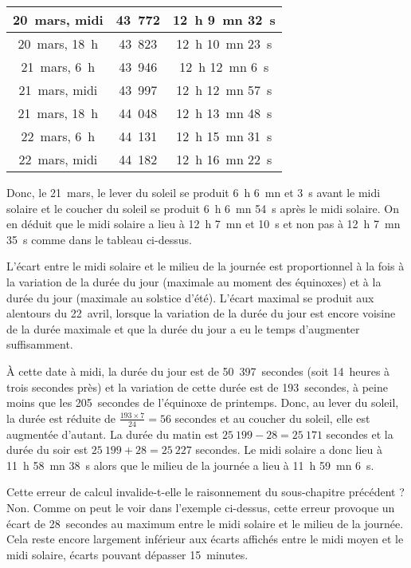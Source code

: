 \documentclass[a4paper]{article}
\newenvironment{texte}{\rmfamily}{}
\begin{document}
\begin{texte}
\vspace{2mm}
\begin{tabular}{|c|c|c|}
\hline
20~mars, midi & 43~772 & 12~h 9~mn 32~s \\
\hline
20~mars, 18~h & 43~823 & 12~h 10~mn 23~s \\
\hline
21~mars, 6~h & 43~946 & 12~h 12~mn 6~s \\
\hline
21~mars, midi & 43~997 & 12~h 12~mn 57~s \\
\hline
21~mars, 18~h & 44~048 & 12~h 13~mn 48~s \\
\hline
22~mars, 6~h & 44~131 & 12~h 15~mn 31~s \\
\hline
22~mars, midi & 44~182 & 12~h 16~mn 22~s \\
\hline
\end{tabular}
\vspace{2mm}

Donc, le 21~mars, le lever du soleil se produit 6~h 6~mn et 3~s
avant le midi solaire et le coucher du soleil se produit
6~h 6~mn 54~s après le midi solaire. On en déduit que le
midi solaire a lieu à 12~h 7~mn et 10~s et non pas
à 12~h 7~mn 35~s comme dans le tableau ci-dessus.

L'écart entre le midi solaire et le milieu de la journée 
est proportionnel à la fois à la variation de la durée
du jour (maximale au moment des équinoxes) et à la durée du 
jour (maximale au solstice d'été). L'écart maximal se produit
aux alentours du 22~avril, lorsque la variation de la durée
du jour est encore voisine de la durée maximale et que la
durée du jour a eu le temps d'augmenter suffisamment.

\vspace{2mm}
\vspace{2mm}

À cette date à midi, la durée du jour est de 50~397~secondes (soit
14~heures à trois secondes près) et la variation de cette durée est de
193~secondes, à peine moins que les 205~secondes de l'équinoxe de
printemps. Donc, au lever du soleil, la durée est réduite de
$\frac{193 \times 7}{24} = 56 $ secondes et au coucher du soleil, elle
est augmentée d'autant. La durée du matin est $ 25~199 - 28 = 25~171 $
secondes et la durée du soir est $ 25~199 + 28 = 25~227 $ secondes.
Le midi solaire a donc lieu à 11~h 58~mn 38~s
alors que le milieu de la journée a lieu à 11~h 59~mn 6~s.

Cette erreur de calcul invalide-t-elle le raisonnement du
sous-chapitre précédent ? Non. Comme on peut le voir dans l'exemple
ci-dessus, cette erreur provoque un écart de 28~secondes au maximum
entre le midi solaire et le milieu de la journée. Cela reste encore
largement inférieur aux écarts affichés entre le midi moyen et le midi
solaire, écarts pouvant dépasser 15~minutes.


\end{texte}
\end{document}
